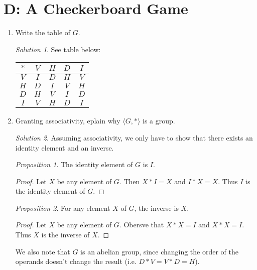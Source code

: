 \documentclass[11pt, b5paper, draft, fleqn]{book}
\theoremstyle{remark}
\newtheorem*{solution}{Solution}
\newtheorem{propnum}{Proposition}
\theoremstyle{plain}
\begin{document}
\section*{D: A Checkerboard Game}
\begin{enumerate}
	\item[1] Write the table of \(G\).
	\begin{solution}
		See table below: \\
		\begin{center}
		\begin{tabular}{c | c c c c}
			\(*\) & \(V\) & \(H\) & \(D\) & \(I\) \\
			\hline
			\(V\) & \(I\) & \(D\) & \(H\) & \(V\) \\
			\(H\) & \(D\) & \(I\) & \(V\) & \(H\) \\
			\(D\) & \(H\) & \(V\) & \(I\) & \(D\) \\
			\(I\) & \(V\) & \(H\) & \(D\) & \(I\)
		\end{tabular}
		\end{center}
	\end{solution}
	
	\item[2] Granting associativity, eplain why \(\langle G, *\rangle\) is a group.
	\begin{solution}
		Assuming associativity, we only have to show that there exists an identity element and an inverse.
		
		\begin{propnum}
			The identity element of \(G\) is \(I\).
		\end{propnum}
		\begin{proof}
			Let \(X\) be any element of \(G\). Then \(X * I = X\) and \(I * X = X\). Thus \(I\) is the identity element of \(G\).
		\end{proof}
		
		\begin{propnum}
			For any element \(X\) of \(G\), the inverse is \(X\).
		\end{propnum}
		\begin{proof}
			Let \(X\) be any element of \(G\). Obersve that \(X * X = I\) and \(X * X = I\). Thus \(X\) is the inverse of \(X\).
		\end{proof}
	\end{solution}
	
	We also note that \(G\) is an abelian group, since changing the order of the operands doesn't change the result (i.e. \(D * V = V * D = H\)).
\end{enumerate}
\end{document}
